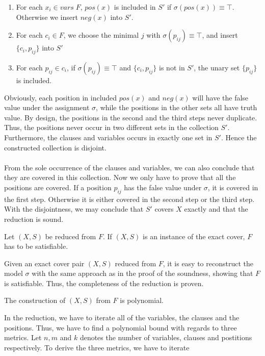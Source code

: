 \begin{enumerate}
    \item For each $x_i \in vars\; F$, $pos(x)$ is included in $S'$ if $\sigma(pos(x)) \equiv \top$. Otherwise we insert $neg(x)$ into $S'$.
    \item For each $c_i \in F$, we choose the minimal $j$ with $\sigma(p_{ij}) \equiv \top$, and insert $\{c_i, p_{ij}\}$ into $S'$
    \item For each $p_{ij} \in c_i$, if $\sigma(p_{ij}) \equiv \top$ and $\{c_i, p_{ij}\}$ is not in $S'$, the unary set $\{p_{ij}\}$ is included. 
\end{enumerate}
Obviously, each position in included $pos(x)$ and $neg(x)$ will have the false value under the assignment $\sigma$, 
while the positions in the other sets all have truth value. By design, the positions in the second and the third steps never duplicate. 
Thus, the positions never occur in two different sets in the collection $S'$. 
Furthermore, the clauses and variables occurs in exactly one set in $S'$. Hence the constructed collection is disjoint. \\\\
From the sole occurrence of the clauses and variables, we can also conclude that they are covered in this collection. 
Now we only have to prove that all the positions are covered. If a position $p_{ij}$ has the false value under $\sigma$, 
it is covered in the first step. Otherwise it is either covered in the second step or the third step. 
With the disjointness, we may conclude that $S'$ covers $X$ exactly and that the reduction is sound.
\begin{lemma}[Completeness]
    Let $(X, S)$ be reduced from $F$. If $(X, S)$ is an instance of the exact cover, $F$ has to be satisfiable.
\end{lemma}
Given an exact cover pair $(X, S)$ reduced from $F$, it is easy to reconstruct the model $\sigma$ with the same approach as in the proof of the soundness, 
showing that $F$ is satisfiable. Thus, the completeness of the reduction is proven. 
\begin{lemma}
    The construction of $(X, S)$ from $F$ is polynomial. 
\end{lemma}
In the reduction, we have to iterate all of the variables, the clauses and the positions. 
Thus, we have to find a polynomial bound with regards to three metrics. Let $n, m$ and $k$ denotes 
the number of variables, clauses and postitions respectively. To derive the three metrics, we have to iterate 
